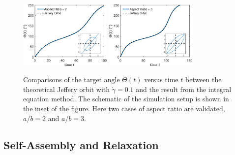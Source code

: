 \documentclass[lineno]{jfm}
\begin{document}
\begin{figure}
\centering
\includegraphics[width=0.4\textwidth]{JefferyOrbit2.eps}
\includegraphics[width=0.4\textwidth]{JefferyOrbit3.eps}
  \caption{Comparisons of the target angle $\Theta(t)$ versus time $t$ between the theoretical Jeffery orbit with $\dot\gamma=0.1$ and the result from the integral equation method. The schematic of the simulation setup is shown in the inset of the figure. Here two cases of aspect ratio are validated, $a/b = 2$ and $a/b=3$.
  }
    \label{figure1}
\end{figure}

\subsection{Self-Assembly and Relaxation}
\end{document}

